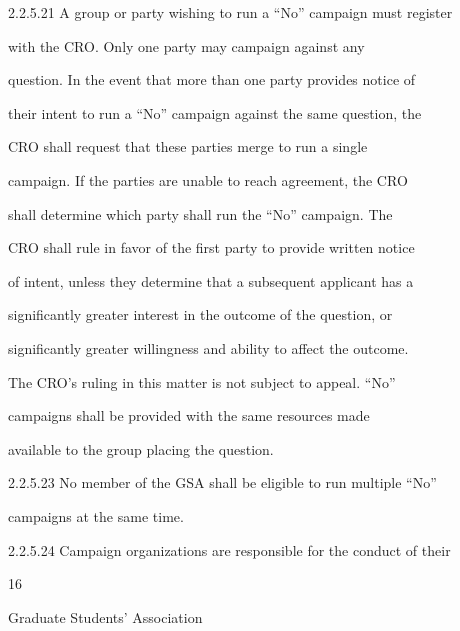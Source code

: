   

2.2.5.21       A group or party wishing to run a “No” campaign must register  

               with   the   CRO.   Only   one   party   may   campaign   against   any  

               question. In the event that more than one party provides notice of  

               their intent to run a “No” campaign against the same question, the  

               CRO  shall  request  that  these  parties  merge  to  run  a  single  

               campaign. If the parties are unable to reach agreement, the CRO  

               shall  determine  which  party  shall  run  the  “No”  campaign.  The  

               CRO shall rule in favor of the first party to provide written notice  

               of intent, unless they determine that a subsequent applicant has a  

               significantly  greater  interest  in  the  outcome  of  the  question,  or  

               significantly greater willingness and ability to affect the outcome.  

               The  CRO’s  ruling  in  this  matter  is  not  subject  to  appeal.  “No”  

               campaigns  shall  be  provided  with  the  same  resources  made  

               available to the group placing the question.  

  

2.2.5.23       No  member  of  the  GSA  shall  be  eligible  to  run  multiple  “No”  

               campaigns at the same time.   

  

2.2.5.24       Campaign  organizations  are  responsible  for  the  conduct of  their  



                                                       16  

                                                                                                               

                                Graduate Students’ Association  

